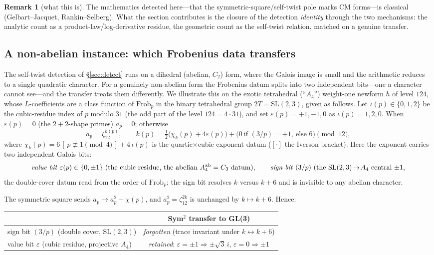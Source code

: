 \documentclass[11pt]{article}
\theoremstyle{definition}
\newtheorem{remark}[theorem]{Remark}
\begin{document}
\begin{remark}[what this is]
The mathematics detected here---that the symmetric-square/self-twist pole marks CM forms---is
classical (Gelbart--Jacquet, Rankin--Selberg). What the section contributes is the closure of the
detection \emph{identity} through the two mechanisms: the analytic count as a product-law/log-derivative residue, the geometric count as the self-twist relation, matched on a genuine transfer.
\end{remark}

\subsection{A non-abelian instance: which Frobenius data transfers}\label{sec:a4}

The self-twist detection of \S\ref{sec:detect} runs on a dihedral (abelian, $C_2$) form, where the
Galois image is small and the arithmetic reduces to a single quadratic character. For a genuinely
non-abelian form the Frobenius datum splits into two independent bits---one a character cannot
see---and the transfer treats them differently. We illustrate this on the exotic tetrahedral
(``$A_4$'') weight-one newform $h$ of level $124$, whose $L$-coefficients are a class function of
$\mathrm{Frob}_p$ in the binary tetrahedral group $2T=\mathrm{SL}(2,3)$, given as follows. Let $\iota(p)\in\{0,1,2\}$ be the cubic-residue index of $p$ modulo $31$ (the odd part of the
level $124=4\cdot31$), and set $\varepsilon(p)=+1,-1,0$ as $\iota(p)=1,2,0$. When $\varepsilon(p)=0$ (the
$2{+}2$-shape primes) $a_p=0$; otherwise
\[
  a_p=\zeta_{12}^{k(p)},\qquad
  k(p)=\tfrac12\big(\chi_k(p)+4\varepsilon(p)\big)+\big(0\ \text{if }(3/p)=+1,\ \text{else }6\big)\pmod{12},
\]
where $\chi_k(p)=6\,[\,p\not\equiv1\!\!\pmod 4\,]+4\,\iota(p)$ is the quartic$\times$cubic exponent datum
($[\cdot]$ the Iverson bracket). Here the exponent carries two independent Galois bits:
\[
  \text{\emph{value bit}}\ \varepsilon(p)\in\{0,\pm1\}\ \text{(the cubic residue, the abelian
  $A_4^{\mathrm{ab}}=C_3$ datum)},\qquad
  \text{\emph{sign bit}}\ (3/p)\ \text{(the $\mathrm{SL}(2,3)\!\to\!A_4$ central $\pm1$,}
\]
the double-cover datum read from the order of $\mathrm{Frob}_p$; the sign bit resolves $k$ versus
$k+6$ and is invisible to any abelian character.

The symmetric square sends $a_p\mapsto a_p^2-\chi(p)$, and $a_p^2=\zeta_{12}^{2k}$ is unchanged by
$k\mapsto k+6$. Hence:

\begin{center}
\begin{tabular}{lc}
\toprule
 & Sym$^2$ transfer to GL(3) \\
\midrule
sign bit $(3/p)$ (double cover, $\mathrm{SL}(2,3)$) & \emph{forgotten} (trace invariant under $k\!\leftrightarrow\!k{+}6$) \\
value bit $\varepsilon$ (cubic residue, projective $A_4$) & \emph{retained}: $\varepsilon=\pm1\Rightarrow\pm\sqrt3\,i$, $\varepsilon=0\Rightarrow\pm1$ \\
\bottomrule
\end{tabular}
\end{center}
\end{document}
